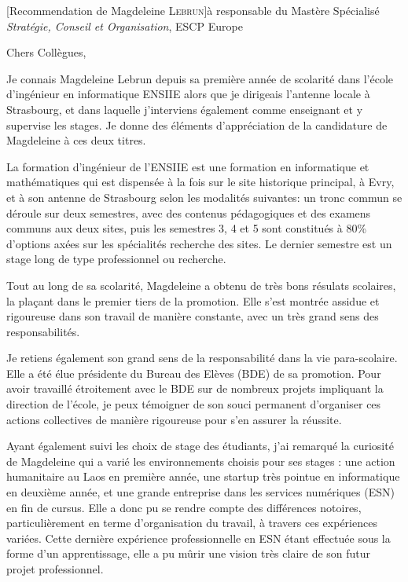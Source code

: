 \documentclass[a4paper,10pt]{article}
\begin{document}

\begin{letter}[Recommendation de Magdeleine \textsc{Lebrun}]{à}%
{responsable du Mastère Spécialisé \emph{Stratégie, Conseil et
  Organisation}, ESCP Europe}

Chers Collègues,

Je connais Magdeleine Lebrun depuis sa  première année de scolarité dans l'école
d'ingénieur en  informatique ENSIIE  alors que je  dirigeais l'antenne  locale à
Strasbourg,  et  dans laquelle  j'interviens  également  comme enseignant  et  y
supervise les stages.  Je donne des éléments d'appréciation de la candidature de
Magdeleine à ces deux titres.


La formation d'ingénieur de l'ENSIIE est une formation en informatique et
mathématiques qui est dispensée à la fois sur le site
historique principal, à Evry, et à son antenne de Strasbourg selon les modalités
suivantes: un tronc commun se déroule sur deux semestres, avec des contenus 
pédagogiques et des examens communs aux deux sites, puis les semestres 3, 4 et 5
sont constitués à 80\% d'options axées sur les spécialités recherche des sites.
Le dernier semestre est un stage long de type professionnel ou recherche. 

Tout  au  long de  sa  scolarité,  Magdeleine a  obtenu  de  très bons  résulats
scolaires, la plaçant dans le premier tiers de la promotion. Elle s'est montrée
assidue et rigoureuse dans son travail de manière constante, avec un très grand
sens des responsabilités. 
 

Je  retiens  également  son  grand  sens   de  la  responsabilité  dans  la  vie
para-scolaire.  Elle  a été  élue présidente  du Bureau des  Elèves (BDE)  de sa
promotion.  Pour avoir travaillé étroitement avec le BDE sur de nombreux projets
impliquant la  direction de l'école,  je peux  témoigner de son  souci permanent
d'organiser ces actions  collectives de manière rigoureuse pour  s'en assurer la
réussite.

Ayant  également suivi  les  choix  de stage  des  étudiants,  j'ai remarqué  la
curiosité de Magdeleine qui a varié les environnements choisis pour ses stages :
une action  humanitaire au Laos en  première année, une startup  très pointue en
informatique  en deuxième  année, et  une  grande entreprise  dans les  services
numériques (ESN) en fin de cursus. Elle a donc pu se rendre compte des différences
notoires, particulièrement en terme d'organisation du travail, à travers ces
expériences variées. Cette dernière expérience professionnelle en ESN étant
effectuée sous la forme d'un apprentissage, elle a pu mûrir une vision très
claire de son futur projet professionnel.



\end{letter}
\end{document}
